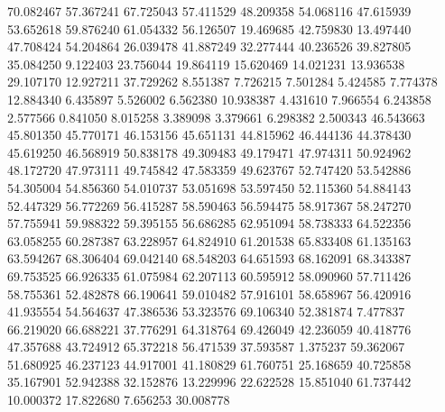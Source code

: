 70.082467
57.367241
67.725043
57.411529
48.209358
54.068116
47.615939
53.652618
59.876240
61.054332
56.126507
19.469685
42.759830
13.497440
47.708424
54.204864
26.039478
41.887249
32.277444
40.236526
39.827805
35.084250
9.122403
23.756044
19.864119
15.620469
14.021231
13.936538
29.107170
12.927211
37.729262
8.551387
7.726215
7.501284
5.424585
7.774378
12.884340
6.435897
5.526002
6.562380
10.938387
4.431610
7.966554
6.243858
2.577566
0.841050
8.015258
3.389098
3.379661
6.298382
2.500343
46.543663
45.801350
45.770171
46.153156
45.651131
44.815962
46.444136
44.378430
45.619250
46.568919
50.838178
49.309483
49.179471
47.974311
50.924962
48.172720
47.973111
49.745842
47.583359
49.623767
52.747420
53.542886
54.305004
54.856360
54.010737
53.051698
53.597450
52.115360
54.884143
52.447329
56.772269
56.415287
58.590463
56.594475
58.917367
58.247270
57.755941
59.988322
59.395155
56.686285
62.951094
58.738333
64.522356
63.058255
60.287387
63.228957
64.824910
61.201538
65.833408
61.135163
63.594267
68.306404
69.042140
68.548203
64.651593
68.162091
68.343387
69.753525
66.926335
61.075984
62.207113
60.595912
58.090960
57.711426
58.755361
52.482878
66.190641
59.010482
57.916101
58.658967
56.420916
41.935554
54.564637
47.386536
53.323576
69.106340
52.381874
7.477837
66.219020
66.688221
37.776291
64.318764
69.426049
42.236059
40.418776
47.357688
43.724912
65.372218
56.471539
37.593587
1.375237
59.362067
51.680925
46.237123
44.917001
41.180829
61.760751
25.168659
40.725858
35.167901
52.942388
32.152876
13.229996
22.622528
15.851040
61.737442
10.000372
17.822680
7.656253
30.008778
